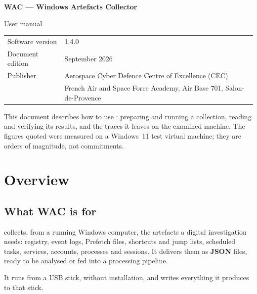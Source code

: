 \documentclass[11pt,a4paper,oneside]{report}
\begin{document}

\thispagestyle{empty}
\vspace*{\fill}
{\color{marine}\Large\bfseries WAC — Windows Artefacts Collector}\par
{\color{bleu}User manual}\par
\medskip
\begin{tabular}{@{}ll@{}}
Software version & 1.4.0 \\
Document edition & September 2026 \\
Publisher & Aerospace Cyber Defence Centre of Excellence (CEC) \\
          & French Air and Space Force Academy, Air Base 701, Salon-de-Provence \\
\end{tabular}

\bigskip
{\small\color{gris}This document describes how to use \wac{}: preparing and
running a collection, reading and verifying its results, and the traces it
leaves on the examined machine. The figures quoted were measured on a
Windows~11 test virtual machine; they are orders of magnitude, not
commitments.}
\vspace*{2cm}
\clearpage

\tableofcontents

\chapter{Overview}

\section{What WAC is for}

\wac{} collects, from a running Windows computer, the artefacts a digital
investigation needs: registry, event logs, Prefetch files, shortcuts and jump
lists, scheduled tasks, services, accounts, processes and sessions. It delivers
them as \textbf{JSON} files, ready to be analysed or fed into a processing
pipeline.

It runs from a USB stick, without installation, and writes everything it
produces to that stick.
\end{document}

